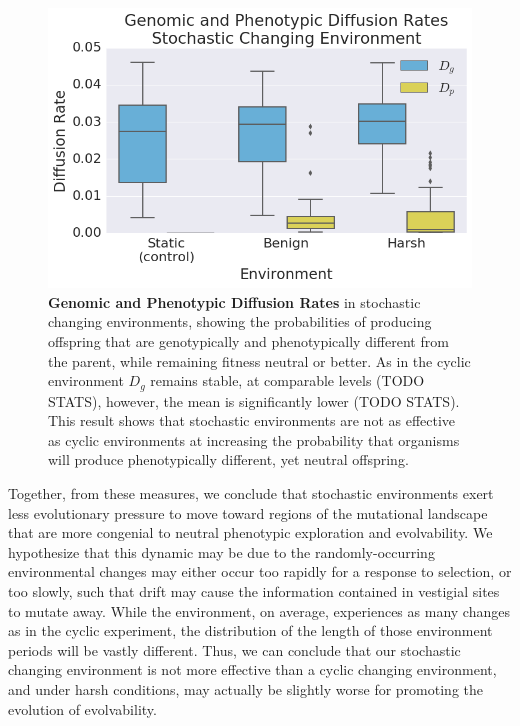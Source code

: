 \documentclass[10pt,letterpaper]{article}
\begin{document}
\begin{figure}[!h] %

\includegraphics[trim={0.2cm 0 0.4cm 0.25cm},clip,width=1\columnwidth]{figures/CSE_D_g_D_p__box.png}
\caption{{\bf Genomic and Phenotypic Diffusion Rates} in stochastic changing environments, showing the probabilities of producing offspring that are genotypically and phenotypically different from the parent, while remaining fitness neutral or better. As in the cyclic environment $D_g$ remains stable, at comparable levels (TODO STATS), however, the mean is significantly lower (TODO STATS). This result shows that stochastic environments are not as effective as cyclic environments at increasing the probability that organisms will produce phenotypically different, yet neutral offspring.
}\label{fig:CSE_diffusion_rate}

\end{figure}
%
Together, from these measures, we conclude that stochastic environments exert less evolutionary pressure to move toward regions of the mutational landscape that are more congenial to neutral phenotypic exploration and evolvability. We hypothesize that this dynamic may be due to the randomly-occurring environmental changes may either occur too rapidly for a response to selection, or too slowly, such that drift may cause the information contained in vestigial sites to mutate away. While the environment, on average, experiences as many changes as in the cyclic experiment, the distribution of the length of those environment periods will be vastly different. Thus, we can conclude that our stochastic changing environment is not more effective than a cyclic changing environment, and under harsh conditions, may actually be slightly worse for promoting the evolution of evolvability.
\end{document}
